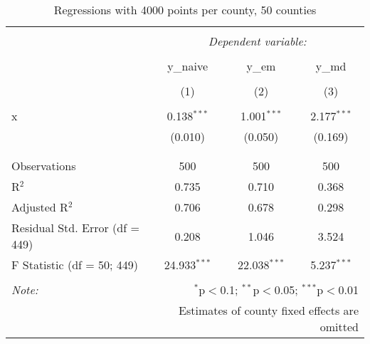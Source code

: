 
\begin{table}[!htbp] \centering 
  \caption{Regressions with 4000 points per county, 50 counties} 
  \label{} 
\begin{tabular}{@{\extracolsep{5pt}}lccc} 
\\[-1.8ex]\hline 
\hline \\[-1.8ex] 
 & \multicolumn{3}{c}{\textit{Dependent variable:}} \\ 
\cline{2-4} 
\\[-1.8ex] & y\_naive & y\_em & y\_md \\ 
\\[-1.8ex] & (1) & (2) & (3)\\ 
\hline \\[-1.8ex] 
 x & 0.138$^{***}$ & 1.001$^{***}$ & 2.177$^{***}$ \\ 
  & (0.010) & (0.050) & (0.169) \\ 
  & & & \\ 
\hline \\[-1.8ex] 
Observations & 500 & 500 & 500 \\ 
R$^{2}$ & 0.735 & 0.710 & 0.368 \\ 
Adjusted R$^{2}$ & 0.706 & 0.678 & 0.298 \\ 
Residual Std. Error (df = 449) & 0.208 & 1.046 & 3.524 \\ 
F Statistic (df = 50; 449) & 24.933$^{***}$ & 22.038$^{***}$ & 5.237$^{***}$ \\ 
\hline 
\hline \\[-1.8ex] 
\textit{Note:}  & \multicolumn{3}{r}{$^{*}$p$<$0.1; $^{**}$p$<$0.05; $^{***}$p$<$0.01} \\ 
 & \multicolumn{3}{r}{Estimates of county fixed effects are omitted} \\ 
\end{tabular} 
\end{table} 
